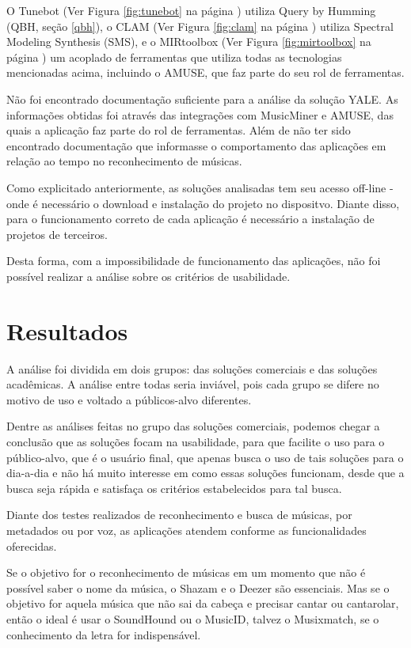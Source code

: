 O Tunebot (Ver Figura \ref{fig:tunebot} na página \pageref{fig:tunebot}) utiliza Query by Humming (QBH, seção \ref{qbh}), o CLAM (Ver Figura \ref{fig:clam} na página \pageref{fig:clam}) utiliza Spectral Modeling Synthesis (SMS), e o MIRtoolbox (Ver Figura \ref{fig:mirtoolbox} na página \pageref{fig:mirtoolbox}) um acoplado de ferramentas que utiliza todas as tecnologias mencionadas acima, incluindo o AMUSE, que faz parte do seu rol de ferramentas.

Não foi encontrado documentação suficiente para a análise da solução YALE. As informações obtidas foi através das integrações com MusicMiner e AMUSE, das quais a aplicação faz parte do rol de ferramentas. Além de não ter sido encontrado documentação que informasse o comportamento das aplicações em relação ao tempo no reconhecimento de músicas. 

Como explicitado anteriormente, as soluções analisadas tem seu acesso off-line - onde é necessário o download e instalação do projeto no dispositvo. Diante disso, para o funcionamento correto de cada aplicação é necessário a instalação de projetos de terceiros. 

Desta forma, com a impossibilidade de funcionamento das aplicações, não foi possível realizar a análise sobre os critérios de usabilidade.

\section{Resultados}

A análise foi dividida em dois grupos: das soluções comerciais e das soluções acadêmicas. A análise entre todas seria inviável, pois cada grupo se difere no motivo de uso e voltado a públicos-alvo diferentes.

Dentre as análises feitas no grupo das soluções comerciais, podemos chegar a conclusão que as soluções focam na usabilidade, para que facilite o uso para o público-alvo, que é o usuário final, que apenas busca o uso de tais soluções para o dia-a-dia e não há muito interesse em como essas soluções funcionam, desde que a busca seja rápida e satisfaça os critérios estabelecidos para tal busca.

Diante dos testes realizados de reconhecimento e busca de músicas, por metadados ou por voz, as aplicações atendem conforme as funcionalidades oferecidas. 

Se o objetivo for o reconhecimento de músicas em um momento que não é possível saber o nome da música, o Shazam e o Deezer são essenciais. Mas se o objetivo for aquela música que não sai da cabeça e precisar cantar ou cantarolar, então o ideal é usar o SoundHound ou o MusicID, talvez o Musixmatch, se o conhecimento da letra for indispensável.

